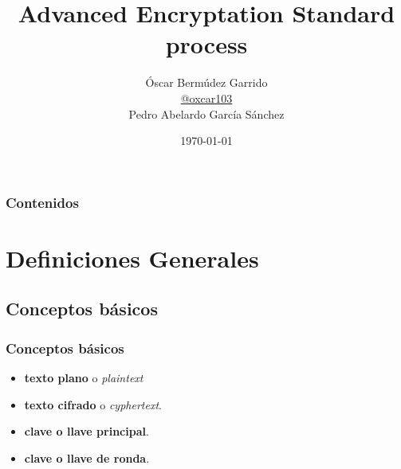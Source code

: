 \documentclass{beamer}
\title[AES process]{Advanced Encryptation Standard process} %
\author[Óscar Bermúdez, P. García Sánchez]{
	Óscar Bermúdez Garrido\\	
	\href{http://www.github.com/oxcar103}{@oxcar103}\\
	Pedro Abelardo García Sánchez
} %
\institute[UGR] %
{
  Universidad de Granada \\ %
  \medskip
  \textit{oscarbg@correo.ugr.es} %
}
\date{\today} %
\begin{document}
\begin{frame}
\titlepage %
\end{frame}

\begin{frame}
  \frametitle{Contenidos} %
  \tableofcontents
\end{frame}




\section{Definiciones Generales} %

	\subsection{Conceptos básicos} %
	\begin{frame}
	\frametitle{Conceptos básicos}
	\begin{itemize}
		\item \textbf{texto plano} o \textit{plaintext}

		\item \textbf{texto cifrado} o \textit{cyphertext}.
		
		\item \textbf{clave o llave principal}.
		
		\item \textbf{clave o llave de ronda}.
	\end{itemize}
	\end{frame}
	
\end{document}
